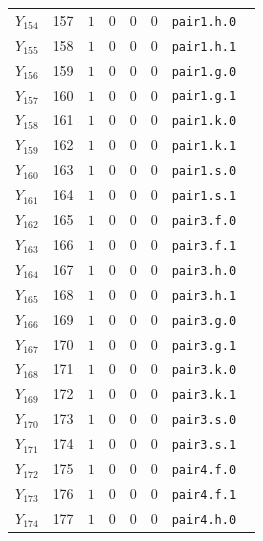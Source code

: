 {\begin{longtable}{@{}r r c r r r p{0.49\linewidth}@{}}
\(Y_{154}\) & 157 & \(1\) & 0 & 0 & 0 & \texttt{pair1.\allowbreak{}h.\allowbreak{}0} \\
\(Y_{155}\) & 158 & \(1\) & 0 & 0 & 0 & \texttt{pair1.\allowbreak{}h.\allowbreak{}1} \\
\(Y_{156}\) & 159 & \(1\) & 0 & 0 & 0 & \texttt{pair1.\allowbreak{}g.\allowbreak{}0} \\
\(Y_{157}\) & 160 & \(1\) & 0 & 0 & 0 & \texttt{pair1.\allowbreak{}g.\allowbreak{}1} \\
\(Y_{158}\) & 161 & \(1\) & 0 & 0 & 0 & \texttt{pair1.\allowbreak{}k.\allowbreak{}0} \\
\(Y_{159}\) & 162 & \(1\) & 0 & 0 & 0 & \texttt{pair1.\allowbreak{}k.\allowbreak{}1} \\
\(Y_{160}\) & 163 & \(1\) & 0 & 0 & 0 & \texttt{pair1.\allowbreak{}s.\allowbreak{}0} \\
\(Y_{161}\) & 164 & \(1\) & 0 & 0 & 0 & \texttt{pair1.\allowbreak{}s.\allowbreak{}1} \\
\(Y_{162}\) & 165 & \(1\) & 0 & 0 & 0 & \texttt{pair3.\allowbreak{}f.\allowbreak{}0} \\
\(Y_{163}\) & 166 & \(1\) & 0 & 0 & 0 & \texttt{pair3.\allowbreak{}f.\allowbreak{}1} \\
\(Y_{164}\) & 167 & \(1\) & 0 & 0 & 0 & \texttt{pair3.\allowbreak{}h.\allowbreak{}0} \\
\(Y_{165}\) & 168 & \(1\) & 0 & 0 & 0 & \texttt{pair3.\allowbreak{}h.\allowbreak{}1} \\
\(Y_{166}\) & 169 & \(1\) & 0 & 0 & 0 & \texttt{pair3.\allowbreak{}g.\allowbreak{}0} \\
\(Y_{167}\) & 170 & \(1\) & 0 & 0 & 0 & \texttt{pair3.\allowbreak{}g.\allowbreak{}1} \\
\(Y_{168}\) & 171 & \(1\) & 0 & 0 & 0 & \texttt{pair3.\allowbreak{}k.\allowbreak{}0} \\
\(Y_{169}\) & 172 & \(1\) & 0 & 0 & 0 & \texttt{pair3.\allowbreak{}k.\allowbreak{}1} \\
\(Y_{170}\) & 173 & \(1\) & 0 & 0 & 0 & \texttt{pair3.\allowbreak{}s.\allowbreak{}0} \\
\(Y_{171}\) & 174 & \(1\) & 0 & 0 & 0 & \texttt{pair3.\allowbreak{}s.\allowbreak{}1} \\
\(Y_{172}\) & 175 & \(1\) & 0 & 0 & 0 & \texttt{pair4.\allowbreak{}f.\allowbreak{}0} \\
\(Y_{173}\) & 176 & \(1\) & 0 & 0 & 0 & \texttt{pair4.\allowbreak{}f.\allowbreak{}1} \\
\(Y_{174}\) & 177 & \(1\) & 0 & 0 & 0 & \texttt{pair4.\allowbreak{}h.\allowbreak{}0} \\

\end{longtable}}
